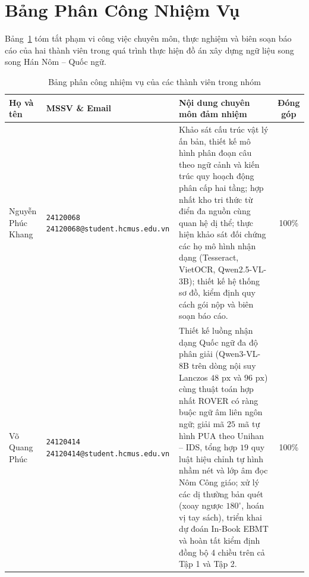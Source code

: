 \section{Bảng Phân Công Nhiệm Vụ}

Bảng~\ref{tab:contribution} tóm tắt phạm vi công việc chuyên môn, thực nghiệm và biên soạn báo cáo của hai thành viên trong quá trình thực hiện đồ án xây dựng ngữ liệu song song Hán Nôm -- Quốc ngữ.

\begin{table}[H]
    \centering
    \footnotesize
    \renewcommand{\arraystretch}{1.25}
    \begin{tabularx}{\textwidth}{l p{} X c}
        \toprule
        \textbf{Họ và tên} & \textbf{MSSV \& Email} & \textbf{Nội dung chuyên môn đảm nhiệm} & \textbf{Đóng góp} \\
        \midrule
        Nguyễn Phúc Khang & \texttt{24120068} \newline \scriptsize\texttt{24120068@student.hcmus.edu.vn}
            & Khảo sát cấu trúc vật lý ấn bản, thiết kế mô hình phân đoạn câu theo ngữ cảnh và kiến trúc quy hoạch động phân cấp hai tầng; hợp nhất kho tri thức từ điển đa nguồn cùng quan hệ dị thể; thực hiện khảo sát đối chứng các họ mô hình nhận dạng (Tesseract, VietOCR, Qwen2.5-VL-3B); thiết kế hệ thống sơ đồ, kiểm định quy cách gói nộp và biên soạn báo cáo.
            & 100\% \\
        \midrule
        Võ Quang Phúc & \texttt{24120414} \newline \scriptsize\texttt{24120414@student.hcmus.edu.vn}
            & Thiết kế luồng nhận dạng Quốc ngữ đa độ phân giải (Qwen3-VL-8B trên dòng nội suy Lanczos $48\text{ px}$ và $96\text{ px}$) cùng thuật toán hợp nhất ROVER có ràng buộc ngữ âm liên ngôn ngữ; giải mã $25$ mã tự hình PUA theo Unihan -- IDS, tổng hợp $19$ quy luật hiệu chỉnh tự hình nhầm nét và lớp âm đọc Nôm Công giáo; xử lý các dị thường bản quét (xoay ngược $180^\circ$, hoán vị tay sách), triển khai dự đoán In-Book EBMT và hoàn tất kiểm định đồng bộ 4 chiều trên cả Tập 1 và Tập 2.
            & 100\% \\
        \bottomrule
    \end{tabularx}
    \caption{Bảng phân công nhiệm vụ của các thành viên trong nhóm}
    \label{tab:contribution}
\end{table}
